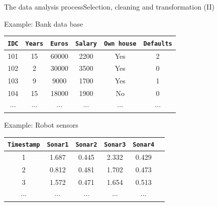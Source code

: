 \documentclass[10pt,compress]{beamer} %
\begin{document}
\begin{frame}[fragile]{The data analysis process}{Selection, cleaning and transformation (II)}
	\begin{exampleblock}{Example: Bank data base}
	 \vspace{-0.3cm}
	\begin{center}
	\begin{tabular}{cccccc}\hline
		 \texttt{IDC} & \texttt{Years}& \texttt{Euros} & \texttt{Salary} & \texttt{Own house} & \texttt{Defaults} \\\hline
		 101 & 15   & 60000 & 2200   & Yes       & 2   \\
		 102 & 2    & 30000 & 3500   & Yes       & 0   \\
		 103 & 9    & 9000  & 1700   & Yes       & 1   \\
		 104 & 15   & 18000 & 1900   & No        & 0   \\
		 $\cdots$ & $\cdots$ & $\cdots$ & $\cdots$   & $\cdots$ & $\cdots$ \\
		 \hline
	 \end{tabular}
	 \end{center}
	 \vspace{-0.4cm}
	 \end{exampleblock}

	\begin{exampleblock}{Example: Robot sensors}
	 \vspace{-0.3cm}
	\begin{center}
	\begin{tabular}{cccccc}\hline
		 \texttt{Timestamp}	& \texttt{Sonar1} & \texttt{Sonar2} & \texttt{Sonar3} & \texttt{Sonar4}  \\\hline
		 1 			& 1.687	 & 0.445  & 2.332  & 0.429   \\
		 2 			& 0.812	 & 0.481  & 1.702  & 0.473   \\
		 3 			& 1.572  & 0.471  & 1.654  & 0.513   \\
		 $\cdots$   & $\cdots$& $\cdots$& $\cdots$ & $\cdots$ \\
		 \hline
	 \end{tabular}
	 \end{center}
	 \vspace{-0.4cm}
	 \end{exampleblock}
\end{frame}
\end{document}
